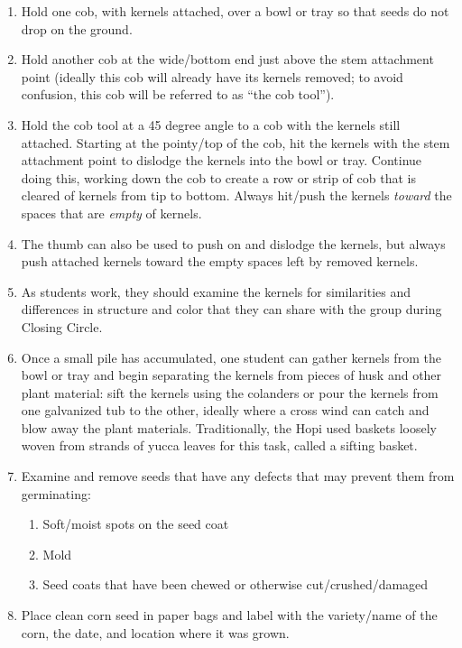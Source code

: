 \documentclass[12pt,]{article}
\providecommand{\tightlist}{%
  \setlength{\itemsep}{0pt}\setlength{\parskip}{0pt}}
\begin{document}
\begin{enumerate}
\def\labelenumi{\arabic{enumi}.}
\tightlist
\item
  Hold one cob, with kernels attached, over a bowl or tray so that seeds do not drop on the ground.
\item
  Hold another cob at the wide/bottom end just above the stem attachment point (ideally this cob will already have its kernels removed; to avoid confusion, this cob will be referred to as ``the cob tool'').
\item
  Hold the cob tool at a 45 degree angle to a cob with the kernels still attached. Starting at the pointy/top of the cob, hit the kernels with the stem attachment point to dislodge the kernels into the bowl or tray. Continue doing this, working down the cob to create a row or strip of cob that is cleared of kernels from tip to bottom. Always hit/push the kernels \emph{toward} the spaces that are \emph{empty} of kernels.\\
\item
  The thumb can also be used to push on and dislodge the kernels, but always push attached kernels toward the empty spaces left by removed kernels.
\item
  As students work, they should examine the kernels for similarities and differences in structure and color that they can share with the group during Closing Circle.
\item
  Once a small pile has accumulated, one student can gather kernels from the bowl or tray and begin separating the kernels from pieces of husk and other plant material: sift the kernels using the colanders or pour the kernels from one galvanized tub to the other, ideally where a cross wind can catch and blow away the plant materials. Traditionally, the Hopi used baskets loosely woven from strands of yucca leaves for this task, called a sifting basket.
\item
  Examine and remove seeds that have any defects that may prevent them from germinating:

  \begin{enumerate}
  \def\labelenumii{\arabic{enumii}.}
  \tightlist
  \item
    Soft/moist spots on the seed coat
  \item
    Mold
  \item
    Seed coats that have been chewed or otherwise cut/crushed/damaged
  \end{enumerate}
\item
  Place clean corn seed in paper bags and label with the variety/name of the corn, the date, and location where it was grown.
\end{enumerate}
\end{document}
